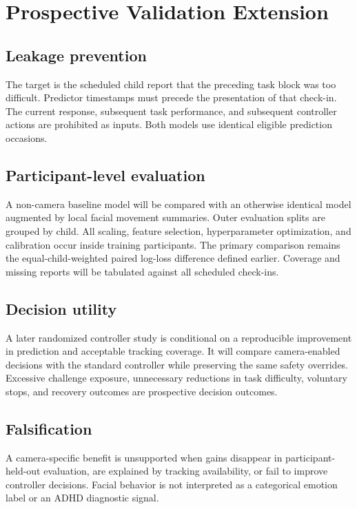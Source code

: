 \section{Prospective Validation Extension}
\subsection{Leakage prevention}
The target is the scheduled child report that the preceding task block was too difficult. Predictor timestamps must precede the presentation of that check-in. The current response, subsequent task performance, and subsequent controller actions are prohibited as inputs. Both models use identical eligible prediction occasions.

\subsection{Participant-level evaluation}
A non-camera baseline model will be compared with an otherwise identical model augmented by local facial movement summaries. Outer evaluation splits are grouped by child. All scaling, feature selection, hyperparameter optimization, and calibration occur inside training participants. The primary comparison remains the equal-child-weighted paired log-loss difference defined earlier. Coverage and missing reports will be tabulated against all scheduled check-ins.

\subsection{Decision utility}
A later randomized controller study is conditional on a reproducible improvement in prediction and acceptable tracking coverage. It will compare camera-enabled decisions with the standard controller while preserving the same safety overrides. Excessive challenge exposure, unnecessary reductions in task difficulty, voluntary stops, and recovery outcomes are prospective decision outcomes.

\subsection{Falsification}
A camera-specific benefit is unsupported when gains disappear in participant-held-out evaluation, are explained by tracking availability, or fail to improve controller decisions. Facial behavior is not interpreted as a categorical emotion label or an ADHD diagnostic signal.
